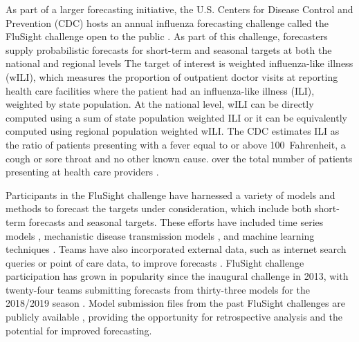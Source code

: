 \documentclass{umassthesis}          %
\begin{document}
As part of a larger forecasting initiative, the U.S. Centers for Disease Control and Prevention (CDC) hosts an annual influenza forecasting challenge called the FluSight challenge open to the public \cite{mcgowan2019collaborative}\cite{biggerstaff2018results}. As part of this challenge, forecasters supply probabilistic forecasts for short-term and seasonal targets at both the national and regional levels The target of interest is weighted influenza-like illness (wILI), which measures the proportion of outpatient doctor visits at reporting health care facilities where the patient had an influenza-like illness (ILI), weighted by state population. At the national level, wILI can be directly computed using a sum of state population weighted ILI or it can be equivalently computed using regional population weighted wILI. The CDC estimates ILI as the ratio of patients presenting with a fever equal to or above 100\textdegree~Fahrenheit, a cough or sore throat and no other known cause. over the total number of patients presenting at health care providers {\cite{thompson2010estimates}}. 

Participants in the FluSight challenge have harnessed a variety of models and methods to forecast the targets under consideration, which include both short-term forecasts and seasonal targets. These efforts have included time series models \cite{kandula2019near}, mechanistic disease transmission models \cite{osthus2017forecasting}\cite{osthus2019dynamic}, and machine learning techniques \cite{brooks2018nonmechanistic}\cite{kandula2018evaluation}\cite{adhikari2019epideep}\cite{reich2019accuracy}. Teams have also incorporated external data, such as internet search queries or point of care data, to improve forecasts \cite{dugas2013Influenza}\cite{araz2014using}\cite{volkova2017forecasting}\cite{osthus2019even}. FluSight challenge participation has grown in popularity since the inaugural challenge in 2013, with twenty-four teams submitting forecasts from thirty-three models for the 2018/2019 season \cite{forecasts}.  Model submission files from the past FluSight challenges are publicly available \cite{forecasts}, providing the opportunity for retrospective analysis and the potential for improved forecasting.
\end{document}
